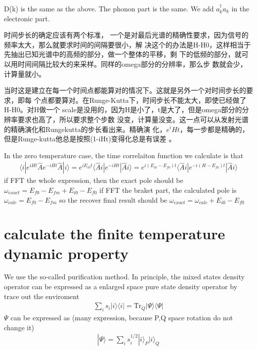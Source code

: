 \documentclass[a4paper,11pt]{ctexart}
\begin{document}
D(k) is the same as the above.
The phonon part is the same. We add $a^\dagger_k a_k$ in the electronic part.



时间步长的确定应该有两个标准，
一个是对最后光谱的精确性要求，因为信号的频率太大，那么就要求时间的间隔要很小，解
决这个的办法是H-H0，这样相当于先抽出已知光谱中的高频的部分，做一个整体的平移，剩
下的低频的部分，就可以用时间间隔比较大的来采样。同样的omega部分的分辨率，那么步
数就会少，计算量就小。

当时这是建立在每一个时间点都能算对的情况下。这就是另外一个对时间步长的要求，即每
个点都要算对。在Runge-Kutta下，时间步长不能太大，即使已经做了H-H0。对H做一个
scale是没用的，因为H是小了，t是大了，但是omega部分的分辨率要求也高了，所以要求整个步数
没变，计算量没变。这一点可以从发射光谱的精确演化和Rungekutta的步长看出来。精确演
化，$e^iHt$，每一步都是精确的，但是Runge-kutta他总是按照(1-iHt)变得化总是有误差
。

In the zero temperature case, the time correlaiton function we calculate is that
\begin{gather}
    \langle i | e^{iHt} \hat{A} e^{-iHt} \hat{A} | i \rangle 
    = e^{iE_{i0} t} \langle \hat{A}i | e^{-iHt} | \hat{A} i \rangle 
    = e^{i(E_{i0}-E_{f0}) t} \langle \hat{A}i | e^{-i(H-E_{f0})t} | \hat{A} i \rangle
\end{gather}
if FFT the whole expression, then the exact pole should be
$\omega_{exact} = E_{f0}-E_{fm} + E_{i0}-E_{f0}$
if FFT the braket part, the calculated pole is 
$\omega_{calc} = E_{f0}-E_{fm}$
so the recover final result should be 
$\omega_{exact} = \omega_{calc} + E_{i0}-E_{f0}$


\section{calculate the finite temperature dynamic property}
We use the so-called purification method.
In principle, the mixed states density operator can be expressed as a enlarged
space pure state density operator by trace out the enviroment
\begin{gather}
    \sum_i s_i | i \rangle \langle i | = \textrm{Tr}_Q  | \Psi \rangle \langle \Psi |
\end{gather}
$\Psi$ can be expressed as (many expression, because P,Q space rotation do not
change it)
\begin{gather}
    | \Psi \rangle =  \sum_i s_i^{1/2} | i \rangle_P | i \rangle_Q 
\end{gather}
\end{document}
